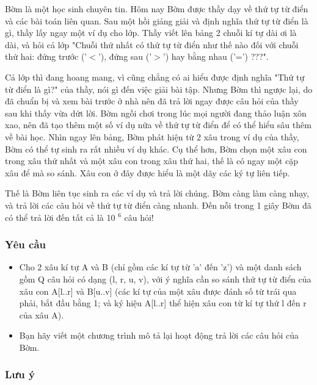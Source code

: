 



   Bờm là một học sinh chuyên tin. Hôm nay Bờm được thầy dạy về thứ tự từ điển và các bài toán liên quan. Sau một hồi giảng giải và định nghĩa thứ tự từ điển là gì, thầy lấy ngay một ví dụ cho lớp. Thầy viết lên bảng 2 chuỗi kí tự dài ơi là dài, và hỏi cả lớp "Chuỗi thứ nhất có thứ tự từ điển như thế nào đối với chuỗi thứ hai: đứng trước ('$<$'), đứng sau ('$>$') hay bằng nhau ('=') ???".  

   Cả lớp thì đang hoang mang, vì cũng chẳng có ai hiểu được định nghĩa "Thứ tự từ điển là gì?" của thầy, nói gì đến việc giải bài tập. Nhưng Bờm thì ngược lại, do đã chuẩn bị và xem bài trước ở nhà nên đã trả lời ngay được câu hỏi của thầy sau khi thấy vừa dứt lời. Bờm ngồi chơi trong lúc mọi người đang thảo luận xôn xao, nên đã tạo thêm một số ví dụ nữa về thứ tự từ điển để có thể hiểu sâu thêm về bài học. Nhìn ngay lên bảng, Bờm phát hiện từ 2 xâu trong ví dụ của thầy, Bờm có thể tự sinh ra rất nhiều ví dụ khác. Cụ thể hơn, Bờm chọn một xâu con trong xâu thứ nhất và một xâu con trong xâu thứ hai, thế là có ngay một cặp xâu để mà so sánh. Xâu con ở đây được hiểu là một dãy các ký tự liên tiếp.  

   Thế là Bờm liên tục sinh ra các ví dụ và trả lời chúng. Bờm càng làm càng nhạy, và trả lời các câu hỏi về thứ tự từ điển càng nhanh. Đến nỗi trong 1 giây Bờm đã có thể trả lời đến tất cả là 10   $^    6   $   câu hỏi!  

\subsubsection{   Yêu cầu  }
\begin{itemize}
	\item     Cho 2 xâu kí tự A và B (chỉ gồm các kí tự từ 'a' đến 'z') và một danh sách gồm Q câu hỏi có dạng (l, r, u, v), với ý nghĩa cần so sánh thứ tự từ điển của xâu con A[l..r] và B[u..v] (các kí tự của một xâu được đánh số từ trái qua phải, bắt đầu bằng 1; và ký hiệu A[l..r] thể hiện xâu con từ kí tự thứ l đến r của xâu A).   
	\item     Bạn hãy viết một chương trình mô tả lại hoạt động trả lời các câu hỏi của Bờm.   
\end{itemize}

\subsubsection{   Lưu ý  }

